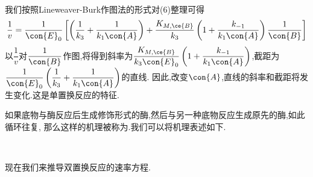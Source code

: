 \documentclass{ctexart}
\begin{document}
\begin{derivation}
\begin{equation}
\begin{aligned}
        \end{aligned}
    \end{equation}
    我们按照Lineweaver-Burk作图法的形式对(6)整理可得
    \begin{equation}
        \dfrac{1}{v}
        =\dfrac{1}{\con{E}_0}\left[\left(\dfrac{1}{k_3}+\dfrac{1}{k_1\con{A}}\right)+\dfrac{K_{M,\ce{B}}}{k_3}\left(1+\dfrac{k_{-1}}{k_1\con{A}}\right)\dfrac{1}{\con{B}}\right]
    \end{equation}
    以$\dfrac{1}{v}$对$\dfrac{1}{\con{B}}$作图,将得到斜率为$\dfrac{K_{M,\ce{B}}}{k_3\con{E}_0}\left(1+\dfrac{k_{-1}}{k_1\con{A}}\right)$,截距为$\dfrac{1}{\con{E}_0}\left(\dfrac{1}{k_3}+\dfrac{1}{k_1\con{A}}\right)$的直线.%
    因此,改变$\con{A}$,直线的斜率和截距将发生变化.这是单置换反应的特征.
\end{derivation}
如果底物与酶反应后生成修饰形式的酶,然后与另一种底物反应生成原先的酶,如此循环往复,%
那么这样的机理被称为.我们可以将机理表述如下.
\begin{tightcenter}
    \\
\end{tightcenter}
现在我们来推导双置换反应的速率方程.
\end{document}
